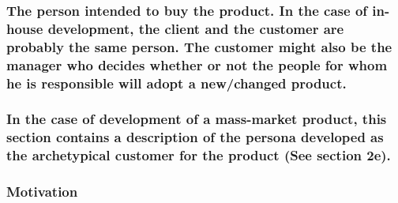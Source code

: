 \documentclass[
]{article}
\begin{document}
\hypertarget{the-person-intended-to-buy-the-product.-in-the-case-of-in-house-development-the-client-and-the-customer-are-probably-the-same-person.-the-customer-might-also-be-the-manager-who-decides-whether-or-not-the-people-for-whom-he-is-responsible-will-adopt-a-newchanged-product.}{%
\subsubsection{\texorpdfstring{The person intended to buy the product.
In the case of in-house development, the client and the customer are
probably the same person. The customer might also be the manager who
decides whether or not the people for whom he is responsible will adopt
a new/changed product.
}{The person intended to buy the product. In the case of in-house development, the client and the customer are probably the same person. The customer might also be the manager who decides whether or not the people for whom he is responsible will adopt a new/changed product. }}\label{the-person-intended-to-buy-the-product.-in-the-case-of-in-house-development-the-client-and-the-customer-are-probably-the-same-person.-the-customer-might-also-be-the-manager-who-decides-whether-or-not-the-people-for-whom-he-is-responsible-will-adopt-a-newchanged-product.}}

\hypertarget{in-the-case-of-development-of-a-mass-market-product-this-section-contains-a-description-of-the-persona-developed-as-the-archetypical-customer-for-the-product-see-section-2e.}{%
\subsubsection{\texorpdfstring{In the case of development of a
mass-market product, this section contains a description of the persona
developed as the archetypical customer for the product (See section 2e).
}{In the case of development of a mass-market product, this section contains a description of the persona developed as the archetypical customer for the product (See section 2e). }}\label{in-the-case-of-development-of-a-mass-market-product-this-section-contains-a-description-of-the-persona-developed-as-the-archetypical-customer-for-the-product-see-section-2e.}}

\hypertarget{motivation-3}{%
\subsubsection{Motivation}\label{motivation-3}}
\end{document}
